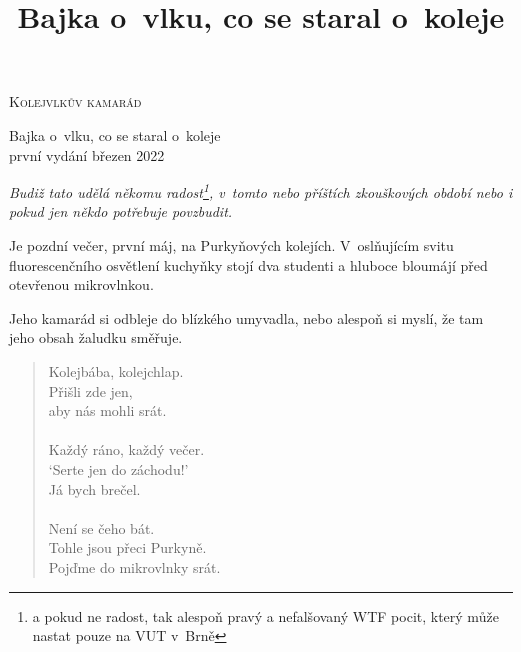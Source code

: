 \documentclass[a5paper, twoside,12pt]{book}
\title{Bajka o~vlku, co se staral o~koleje}
\begin{document}
\begin{titlepage}
    \begin{center}
        {\Large \textsc{Kolejvlkův kamarád}}

        {\LARGE Bajka o~vlku, co se staral o~koleje}\\
        {\large první vydání} \hfill {\large březen 2022}
        \end{center}
\end{titlepage}

\thispagestyle{empty}
\vspace*{\fill}
\emph{Budiž tato  udělá někomu radost\footnote[2]{a pokud ne radost, tak alespoň pravý a nefalšovaný WTF pocit, který může nastat pouze na VUT v~Brně}, v~tomto nebo příštích zkouškových období nebo i pokud jen někdo potřebuje povzbudit.}\\
\vspace*{\fill}

\restoregeometry
\setcounter{page}{1}
Je pozdní večer, první máj, na Purkyňových kolejích. V~oslňujícím svitu fluorescenčního osvětlení kuchyňky stojí dva studenti a hluboce bloumájí před otevřenou mikrovlnkou.



Jeho kamarád si odbleje do blízkého umyvadla, nebo alespoň si myslí, že tam jeho obsah žaludku směřuje.

\begin{verse}
Kolejbába, kolejchlap.\\
Přišli zde jen,\\
aby nás mohli srát.\\
\ \\
Každý ráno, každý večer.\\
`Serte jen do záchodu!'\\
Já bych brečel.\\
\ \\
Není se čeho bát.\\
Tohle jsou přeci Purkyně.\\
Pojďme do mikrovlnky srát.\\
\end{verse}
\end{document}
